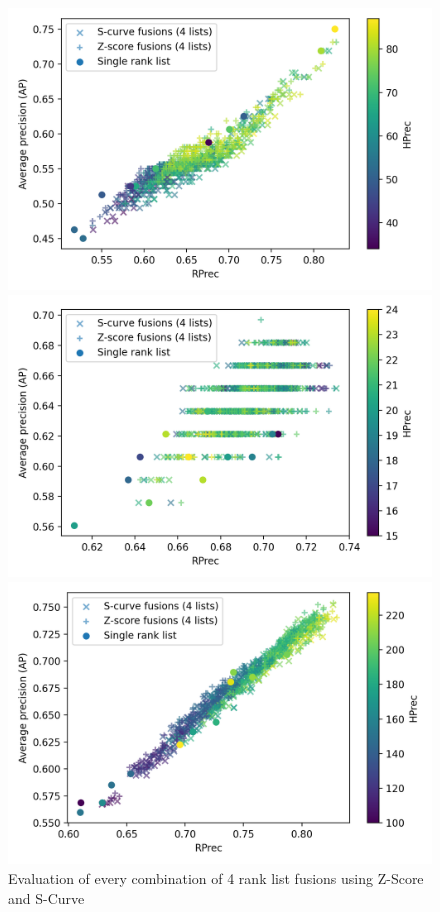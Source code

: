 \begin{figure}
  \centering
  \caption{Evaluation of every combination of 4 rank list fusions using Z-Score and S-Curve}
  \label{fig:fusions}

  \label{fig:fusion_oxquarry}
  \includegraphics[width=\linewidth]{img/fusion_oxquarry.png}

  \label{fig:fusion_brunet}
  \includegraphics[width=\linewidth]{img/fusion_brunet.png}

  \label{fig:fusion_st_jean}
  \includegraphics[width=\linewidth]{img/fusion_st_jean.png}
\end{figure}


